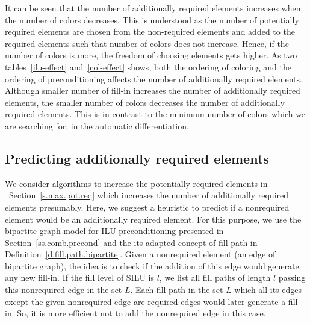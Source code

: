 \documentclass[12pt, twoside,a4paper,toc=bibliography]{scrbook}
\newcommand{\secref}[1]{Section~\protect\ref{#1}}
\newcommand{\defref}[1]{Definition~\protect\ref{#1}}
\begin{document}
It can be seen that the number of additionally required elements increases when
the number of colors decreases. This is understood as the number of potentially
required elements are chosen from the non-required elements and added to the required elements
such that number of colors does not increase. Hence, if the number of colors is more,
the freedom of choosing elements gets higher.
As two tables~\ref{ilu-effect} and~\ref{col-effect} shows,
both the ordering of coloring and the ordering of preconditioning affects the number of
additionally required elements. Although smaller number of fill-in increases
the number of additionally required elements, the smaller number of colors
decreases the number of additionally required elements.
This is in contrast to the minimum number of colors which we are searching for,
in the automatic differentiation.

\subsection{Predicting additionally required elements}
We consider algorithms to increase the potentially required elements in
~\secref{s.max.pot.req} which increases the number of additionally required elements
presumably. Here, we suggest a heuristic to predict if a nonrequired element would be an
additionally required element. 
For this purpose, we use the bipartite graph model for ILU preconditioning
presented in \secref{ss.comb.precond} and the its adapted concept of fill path in 
\defref{d.fill.path.bipartite}. Given a nonrequired element (an edge of bipartite graph),
the idea is to check if the addition of this edge would generate any new fill-in.
If the fill level of SILU is $l$, we list all fill paths of length $l$ passing this nonrequired edge
in the set $L$. Each fill path in the set $L$ which all its edges except the given nonrequired edge
are required edges would later generate a fill-in. So, it is more efficient not to add the
nonrequired edge in this case.
\end{document}

